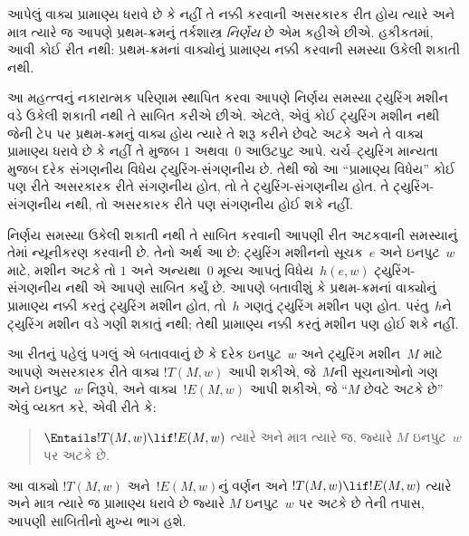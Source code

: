 \begingroup
\makeatletter{}\makeatother

\label{guunit:OLP-0269}


આપેલું વાક્ય પ્રામાણ્ય ધરાવે છે કે નહીં તે
નક્કી કરવાની અસરકારક રીત હોય ત્યારે અને માત્ર ત્યારે
જ આપણે પ્રથમ-ક્રમનું તર્કશાસ્ત્ર \emph{નિર્ણેય} છે એમ
કહીએ છીએ. હકીકતમાં, આવી કોઈ રીત નથી: પ્રથમ-ક્રમનાં
વાક્યોનું પ્રામાણ્ય નક્કી કરવાની સમસ્યા ઉકેલી શકાતી નથી.

આ મહત્ત્વનું નકારાત્મક પરિણામ સ્થાપિત કરવા આપણે
નિર્ણય સમસ્યા ટ્યુરિંગ મશીન વડે ઉકેલી શકાતી નથી તે
સાબિત કરીએ છીએ. એટલે, એવું કોઈ ટ્યુરિંગ મશીન નથી
જેની ટેપ પર પ્રથમ-ક્રમનું વાક્ય હોય ત્યારે
તે શરૂ કરીને છેવટે અટકે અને તે વાક્ય પ્રામાણ્ય ધરાવે
છે કે નહીં તે મુજબ $1$ અથવા~$0$ આઉટપુટ આપે.
ચર્ચ--ટ્યુરિંગ માન્યતા મુજબ દરેક સંગણનીય વિધેય
ટ્યુરિંગ-સંગણનીય છે. તેથી જો આ ``પ્રામાણ્ય વિધેય''
કોઈ પણ રીતે અસરકારક રીતે સંગણનીય હોત, તો તે
ટ્યુરિંગ-સંગણનીય હોત. તે ટ્યુરિંગ-સંગણનીય નથી,
તો અસરકારક રીતે પણ સંગણનીય હોઈ શકે નહીં.

નિર્ણય સમસ્યા ઉકેલી શકાતી નથી તે સાબિત કરવાની
આપણી રીત અટકવાની સમસ્યાનું તેમાં ન્યૂનીકરણ કરવાની
છે. તેનો અર્થ આ છે: ટ્યુરિંગ મશીનનો સૂચક~$e$
અને ઇનપુટ~$w$ માટે, મશીન અટકે તો $1$ અને
અન્યથા~$0$ મૂલ્ય આપતું વિધેય~$h(e,w)$ ટ્યુરિંગ-સંગણનીય
નથી એ આપણે સાબિત કર્યું છે. આપણે બતાવીશું કે
પ્રથમ-ક્રમનાં વાક્યોનું પ્રામાણ્ય નક્કી કરતું ટ્યુરિંગ
મશીન હોત, તો~$h$ ગણતું ટ્યુરિંગ મશીન પણ હોત.
પરંતુ~$h$ને ટ્યુરિંગ મશીન વડે ગણી શકાતું નથી;
તેથી પ્રામાણ્ય નક્કી કરતું મશીન પણ હોઈ શકે નહીં.

આ રીતનું પહેલું પગલું એ બતાવવાનું છે કે દરેક ઇનપુટ~$w$
અને ટ્યુરિંગ મશીન~$M$ માટે આપણે અસરકારક રીતે
વાક્ય $!T(M, w)$ આપી શકીએ, જે~$M$ની
સૂચનાઓનો ગણ અને ઇનપુટ~$w$ નિરૂપે, અને
વાક્ય~$!E(M, w)$ આપી શકીએ, જે ``$M$ છેવટે
અટકે છે'' એવું વ્યક્ત કરે, એવી રીતે કે:
\begin{quote}
  $\Entails !T(M, w) \lif !E(M,w)$ ત્યારે અને માત્ર
  ત્યારે જ, જ્યારે $M$ ઇનપુટ~$w$ પર અટકે છે.
\end{quote}
આ વાક્યો $!T(M, w)$ અને~$!E(M, w)$નું વર્ણન અને
$!T(M, w) \lif !E(M, w)$ ત્યારે અને માત્ર ત્યારે જ
પ્રામાણ્ય ધરાવે છે જ્યારે $M$ ઇનપુટ~$w$ પર અટકે
છે તેની તપાસ, આપણી સાબિતીનો મુખ્ય ભાગ હશે.
\endgroup


\begingroup
\makeatletter{}\makeatother

\label{guunit:OLP-0270}


